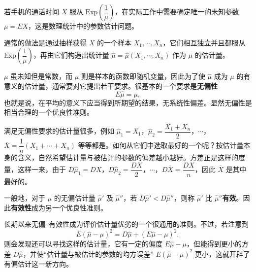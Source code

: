\documentclass[../../main.tex]{subfiles}
\begin{document}
\begin{example}[估计量的无偏性与有效性]\label{example:ch04-估计量}
若手机的通话时间 $X$ 服从 $\mathrm{Exp}\left(\dfrac{1}{\mu}\right)$，在实际工作中需要确定唯一的未知参数 $\mu=EX$，这是数理统计中的参数估计问题。

通常的做法是通过抽样获得 $X$ 的一个样本 $X_1,\cdots,X_n$，它们相互独立并且都服从 $\mathrm{Exp}\left(\dfrac{1}{\mu}\right)$，再由它们构造出统计量 $\hat{\mu}=\hat{\mu}(X_1,\cdots,X_n)$ 作为 $\mu$ 的估计量。

$\mu$ 虽未知但是常数，而 $\hat{\mu}$ 则是样本的函数即随机变量，因此为了使 $\hat{\mu}$ 成为 $\mu$ 的有意义的估计量，通常要对它提出若干要求。很基本的一个要求是\textbf{无偏性}
\[
E\hat{\mu}=\mu,
\]
也就是说，在平均的意义下应当得到所期望的结果，无系统性偏差。显然无偏性是相当合理的一个优良性准则。

满足无偏性要求的估计量很多，例如 $\hat{\mu}_1=X_1$，$\hat{\mu}_2=\dfrac{X_1+X_n}{2}$，$\cdots$，$\bar{X}=\dfrac{1}{n}(X_1+\cdots+X_n)$ 等等都是。如何从它们中选取最好的一个呢？按估计量本身的含义，自然希望估计量与被估计的参数的偏差越小越好。方差正是这样的度量，这样一来，由于 $D\hat{\mu}_1=DX$，$D\hat{\mu}_2=\dfrac{DX}{2}$，$\cdots$，$D\bar{X}=\dfrac{DX}{n}$，因此 $\bar{X}$ 是其中最好的。

一般地，对于 $\mu$ 的无偏估计量 $\hat{\mu}'$ 及 $\hat{\mu}''$，若 $D\hat{\mu}'<D\hat{\mu}''$，则称 $\hat{\mu}'$ 比 $\hat{\mu}''$\textbf{有效}。因此\textbf{有效性}成为另一个优良性准则。

长期以来无偏--有效性成为评价估计量优劣的一个很通用的准则。不过，若注意到
\[
E(\hat{\mu}-\mu)^2=D\hat{\mu}+(E\hat{\mu}-\mu)^2,
\]
则会发现还可以寻找这样的估计量，它有一定的偏度 $E\hat{\mu}-\mu$，但能得到更小的方差 $D\hat{\mu}$，并使``估计量与被估计的参数的均方误差'' $E(\hat{\mu}-\mu)^2$ 更小，这就开辟了有偏估计这一新方向。
\end{example}
\end{document}
